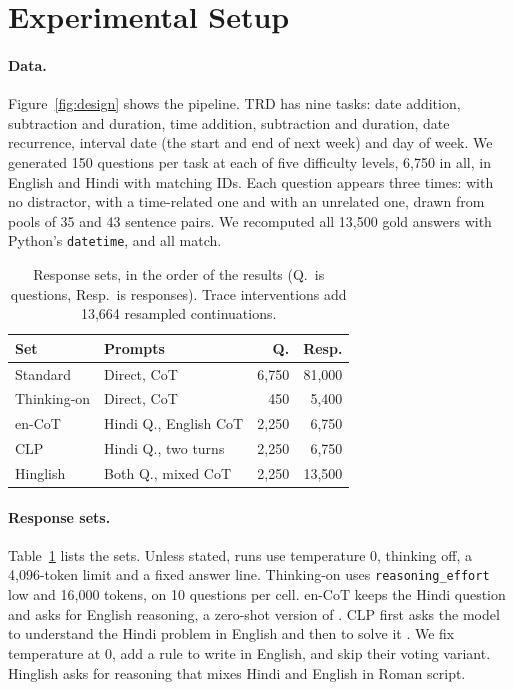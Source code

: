 \documentclass[11pt]{article}
\begin{document}
\section{Experimental Setup}
\label{sec:design}

\paragraph{Data.}
Figure~\ref{fig:design} shows the pipeline. TRD has nine tasks: date addition, subtraction and duration, time addition, subtraction and duration, date recurrence, interval date (the start and end of next week) and day of week. We generated 150 questions per task at each of five difficulty levels, 6,750 in all, in English and Hindi with matching IDs. Each question appears three times: with no distractor, with a time-related one and with an unrelated one, drawn from pools of 35 and 43 sentence pairs. We recomputed all 13,500 gold answers with Python's \texttt{datetime}, and all match.

\begin{table}[t]
\centering
\setlength{\tabcolsep}{3pt}
\begin{tabularx}{\columnwidth}{@{}l>{\raggedright\arraybackslash}Xrr@{}}
\toprule
Set & Prompts & Q. & Resp. \\
\midrule
Standard & Direct, CoT & 6,750 & 81,000 \\
Thinking-on & Direct, CoT & 450 & 5,400 \\
en-CoT & Hindi Q., English CoT & 2,250 & 6,750 \\
CLP & Hindi Q., two turns & 2,250 & 6,750 \\
Hinglish & Both Q., mixed CoT & 2,250 & 13,500 \\
\bottomrule
\end{tabularx}
\caption{Response sets, in the order of the results (Q.\ is questions, Resp.\ is responses). Trace interventions add 13,664 resampled continuations.}
\label{tab:sets}
\end{table}

\paragraph{Response sets.}
Table~\ref{tab:sets} lists the sets. Unless stated, runs use temperature 0, thinking off, a 4,096-token limit and a fixed answer line. Thinking-on uses \texttt{reasoning\_effort} low and 16,000 tokens, on 10 questions per cell. en-CoT keeps the Hindi question and asks for English reasoning, a zero-shot version of \citet{shi-etal-2023-mgsm}. CLP first asks the model to understand the Hindi problem in English and then to solve it \citep{qin-etal-2023-cross}. We fix temperature at 0, add a rule to write in English, and skip their voting variant. Hinglish asks for reasoning that mixes Hindi and English in Roman script.
\end{document}
